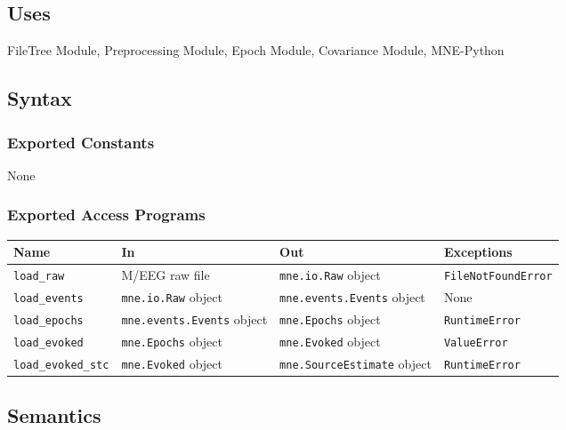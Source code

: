 \documentclass[12pt, titlepage]{article}
\begin{document}
\subsection{Uses}


FileTree Module, Preprocessing Module, Epoch Module, Covariance Module, MNE-Python




\subsection{Syntax}


\subsubsection{Exported Constants}


None




\subsubsection{Exported Access Programs}


\begin{center}
\begin{tabular}{p{3cm} p{4cm} p{4cm} p{4cm}}
\hline
    \textbf{Name} & \textbf{In} & \textbf{Out} & \textbf{Exceptions} \\
\hline
    \lstinline|load_raw| & M/EEG raw file & \lstinline|mne.io.Raw| object & \lstinline|FileNotFoundError| \\
    \lstinline|load_events| & \lstinline|mne.io.Raw| object & \lstinline|mne.events.Events| object & None \\
    \lstinline|load_epochs| & \lstinline|mne.events.Events| object & \lstinline|mne.Epochs| object & \lstinline|RuntimeError| \\
    \lstinline|load_evoked| & \lstinline|mne.Epochs| object & \lstinline|mne.Evoked| object & \lstinline|ValueError| \\
    \lstinline|load_evoked_stc| & \lstinline|mne.Evoked| object & \lstinline|mne.SourceEstimate| object & \lstinline|RuntimeError| \\
\hline
\end{tabular}
\end{center}




\subsection{Semantics}
\end{document}
